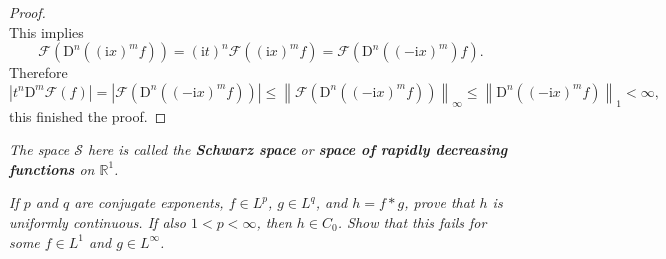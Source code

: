 \begin{proof}
$$$$
This implies 
$$
\mathscr{F} \left( \mathrm{D}^n\left( \left( \mathrm{i}x \right) ^mf \right) \right) =\left( \mathrm{i}t \right) ^n\mathscr{F} \left( \left( \mathrm{i}x \right) ^mf \right) =\mathscr{F} \left( \mathrm{D}^n\left( \left( -\mathrm{i}x \right) ^m \right) f \right) .
$$
Therefore 
$$
\left| t^n\mathrm{D}^m\mathscr{F} \left( f \right) \right|=\left| \mathscr{F} \left( \mathrm{D}^n\left( \left( -\mathrm{i}x \right) ^mf \right) \right) \right|\le \left\| \mathscr{F} \left( \mathrm{D}^n\left( \left( -\mathrm{i}x \right) ^mf \right) \right) \right\| _{\infty}\le \left\| \mathrm{D}^n\left( \left( -\mathrm{i}x \right) ^mf \right) \right\| _1<\infty ,
$$
this finished the proof.
\end{proof}
\begin{note}\em
The space $\mathscr{S}$ here is called the \textbf{Schwarz space} or \textbf{space of rapidly decreasing functions} on $\mathbb{R}^1$.
\end{note}
\begin{problem}\em
If $p$ and $q$ are conjugate exponents, $f\in L^p$, $g\in L^q$, and $h=f*g$, prove that $h$ is uniformly continuous. If also $1<p<\infty$, then $h\in C_0$. Show that this fails for some $f\in L^1$ and $g\in L^\infty$.
\end{problem}
